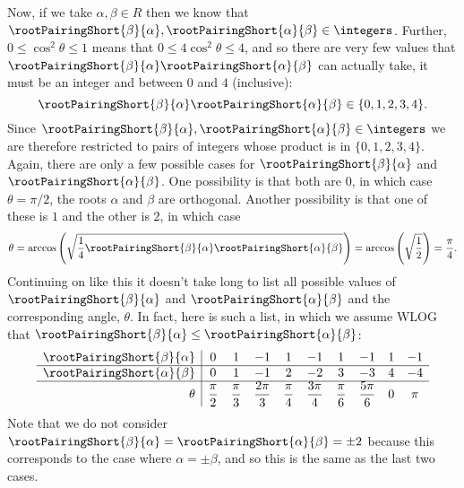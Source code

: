 \documentclass[fleqn]{NotesClass}
\begin{document}
    Now, if we take \(\alpha, \beta \in R\) then we know that \(\rootPairingShort{\beta}{\alpha}, \rootPairingShort{\alpha}{\beta} \in \integers\).
    Further, \(0 \le \cos^2\theta \le 1\) means that \(0 \le 4\cos^2\theta \le 4\), and so there are very few values that \(\rootPairingShort{\beta}{\alpha}\rootPairingShort{\alpha}{\beta}\) can actually take, it must be an integer and between \(0\) and \(4\) (inclusive):
    \begin{equation}
        \rootPairingShort{\beta}{\alpha} \rootPairingShort{\alpha}{\beta} \in \{0, 1, 2, 3, 4\}.
    \end{equation}
    Since \(\rootPairingShort{\beta}{\alpha}, \rootPairingShort{\alpha}{\beta} \in \integers\) we are therefore restricted to pairs of integers whose product is in \(\{0, 1, 2, 3, 4\}\).
    Again, there are only a few possible cases for \(\rootPairingShort{\beta}{\alpha}\) and \(\rootPairingShort{\alpha}{\beta}\).
    One possibility is that both are 0, in which case \(\theta = \pi/2\), the roots \(\alpha\) and \(\beta\) are orthogonal.
    Another possibility is that one of these is \(1\) and the other is \(2\), in which case
    \begin{equation}
        \theta = \arccos\left( \sqrt{\frac{1}{4} \rootPairingShort{\beta}{\alpha} \rootPairingShort{\alpha}{\beta}} \right) = \arccos\left( \sqrt{\frac{1}{2}} \right) = \frac{\pi}{4}.
    \end{equation}
    Continuing on like this it doesn't take long to list all possible values of \(\rootPairingShort{\beta}{\alpha}\) and \(\rootPairingShort{\alpha}{\beta}\) and the corresponding angle, \(\theta\).
    In fact, here is such a list, in which we assume WLOG that \(\rootPairingShort{\beta}{\alpha} \le \rootPairingShort{\alpha}{\beta}\):
    \begin{equation}
        \label{eqn:possible root angles}
        \begin{array}{r|ccccccccc}
            \rootPairingShort{\beta}{\alpha} & 0 & 1 & -1 & 1 & -1 & 1 & -1 & 1 & -1\\ \hline
            \rootPairingShort{\alpha}{\beta} & 0 & 1 & -1 & 2 & -2 & 3 & -3 & 4 & -4\\ \hline
            \theta & \dfrac{\pi}{2} & \dfrac{\pi}{3} & \dfrac{2\pi}{3} & \dfrac{\pi}{4} & \dfrac{3\pi}{4} & \dfrac{\pi}{6} & \dfrac{5\pi}{6} & 0 & \pi\\
        \end{array}
    \end{equation}
    Note that we do not consider \(\rootPairingShort{\beta}{\alpha} = \rootPairingShort{\alpha}{\beta} = \pm 2\) because this corresponds to the case where \(\alpha = \pm\beta\), and so this is the same as the last two cases.
    
\end{document}
